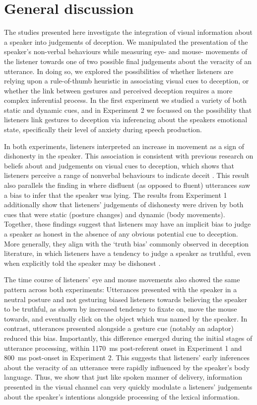 \documentclass[a4paper,man,natbib]{apa6}
\begin{document}
\section{General discussion}
The studies presented here investigate the integration of visual information about a speaker into judgements of deception.
We manipulated the presentation of the speaker's non-verbal behaviours while measuring eye- and mouse- movements of the listener towards one of two possible final judgements about the veracity of an utterance.
In doing so, we explored the possibilities of whether listeners are relying upon a rule-of-thumb heuristic in associating visual cues to deception, or whether the link between gestures and perceived deception requires a more complex inferential process.
In the first experiment we studied a variety of both static and dynamic cues, and in Experiment 2 we focussed on the possibility that listeners link gestures to deception via inferencing about the speakers emotional state, specifically their level of anxiety during speech production.

In both experiments, listeners interpreted an increase in movement as a sign of dishonesty in the speaker.
This association is consistent with previous research on beliefs about and judgements on visual cues to deception, which shows that listeners perceive a range of nonverbal behaviours to indicate deceit \citep[e.g.][]{Zuckerman1981, Akehurst1996, Vrij2000}.
This result also parallels the finding in \citet{Loy2017} where disfluent (as opposed to fluent) utterances saw a bias to infer that the speaker was lying. 
The results from Experiment 1 additionally show that listeners' judgements of dishonesty were driven by both cues that were static (posture changes) and dynamic (body movements). 
Together, these findings suggest that listeners may have an implicit bias to judge a speaker as honest in the absence of any obvious potential cue to deception. 
More generally, they align with the `truth bias' commonly observed in deception literature, in which listeners have a tendency to judge a speaker as truthful, even when explicitly told the speaker may be dishonest \citep{Vrij2000}.

The time course of listeners' eye and mouse movements also showed the same pattern across both experiments:
Utterances presented with the speaker in a neutral posture and not gesturing biased listeners towards believing the speaker to be truthful, as shown by increased tendency to fixate on, move the mouse towards, and eventually click on the object which was named by the speaker. 
In contrast, utterances presented alongside a gesture cue (notably an adaptor) reduced this bias.
Importantly, this difference emerged during the initial stages of utterance processing, within 1170~ms post-referent onset in Experiment 1 and 800~ms post-onset in Experiment 2.
This suggests that listeners' early inferences about the veracity of an utterance were rapidly influenced by the speaker's body language.
Thus, we show that just like spoken manner of delivery, information presented in the visual channel can very quickly modulate a listeners' judgements about the speaker's intentions alongside processing of the lexical information. 
\end{document}
